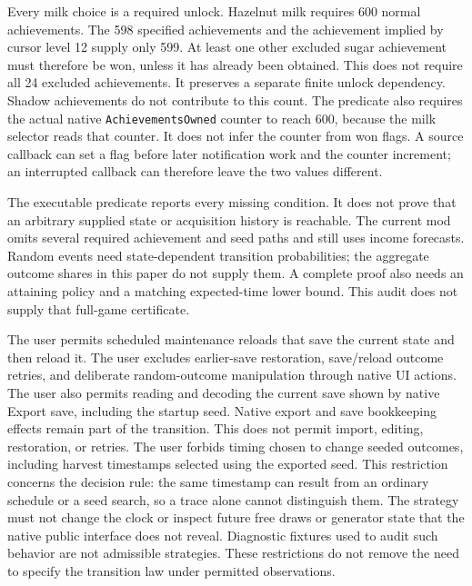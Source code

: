 \documentclass[11pt,a4paper]{article}
\numberwithin{equation}{section}
\theoremstyle{definition}
\theoremstyle{remark}
\begin{document}
Every milk choice is a required unlock. Hazelnut milk requires 600 normal achievements. The 598 specified achievements and the achievement implied by cursor level 12 supply only 599. At least one other excluded sugar achievement must therefore be won, unless it has already been obtained. This does not require all 24 excluded achievements. It preserves a separate finite unlock dependency. Shadow achievements do not contribute to this count. The predicate also requires the actual native \texttt{AchievementsOwned} counter to reach 600, because the milk selector reads that counter. It does not infer the counter from won flags. A source callback can set a flag before later notification work and the counter increment; an interrupted callback can therefore leave the two values different.

The executable predicate reports every missing condition. It does not prove that an arbitrary supplied state or acquisition history is reachable. The current mod omits several required achievement and seed paths and still uses income forecasts. Random events need state-dependent transition probabilities; the aggregate outcome shares in this paper do not supply them. A complete proof also needs an attaining policy and a matching expected-time lower bound. This audit does not supply that full-game certificate.

The user permits scheduled maintenance reloads that save the current state and then reload it. The user excludes earlier-save restoration, save/reload outcome retries, and deliberate random-outcome manipulation through native UI actions. The user also permits reading and decoding the current save shown by native Export save, including the startup seed. Native export and save bookkeeping effects remain part of the transition. This does not permit import, editing, restoration, or retries. The user forbids timing chosen to change seeded outcomes, including harvest timestamps selected using the exported seed. This restriction concerns the decision rule: the same timestamp can result from an ordinary schedule or a seed search, so a trace alone cannot distinguish them. The strategy must not change the clock or inspect future free draws or generator state that the native public interface does not reveal. Diagnostic fixtures used to audit such behavior are not admissible strategies. These restrictions do not remove the need to specify the transition law under permitted observations.
\end{document}
